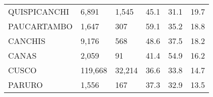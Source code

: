 \begin{tabular}{llllll}
	\cellcolor[HTML]{FF5050}QUISPICANCHI                           & 6,891                                                                 & 1,545                                                            & 45.1                                                                             & 31.1                                                                        & 19.7                                                                                \\
	\cellcolor[HTML]{FF5050}PAUCARTAMBO                            & 1,647                                                                 & 307                                                              & 59.1                                                                             & 35.2                                                                        & 18.8                                                                                \\
	\cellcolor[HTML]{FF5050}CANCHIS                                & 9,176                                                                 & 568                                                              & 48.6                                                                             & 37.5                                                                        & 18.2                                                                                \\
	\cellcolor[HTML]{FF5050}CANAS                                  & 2,059                                                                 & 91                                                               & 41.4                                                                             & 54.9                                                                        & 16.2                                                                                \\
	\cellcolor[HTML]{F8CBAD}CUSCO                                  & 119,668                                                               & 32,214                                                           & 36.6                                                                             & 33.8                                                                        & 14.7                                                                                \\
	\cellcolor[HTML]{F8CBAD}PARURO                                 & 1,556                                                                 & 167                                                              & 37.3                                                                             & 32.9                                                                        & 13.5                                                                                \\

\end{tabular}
